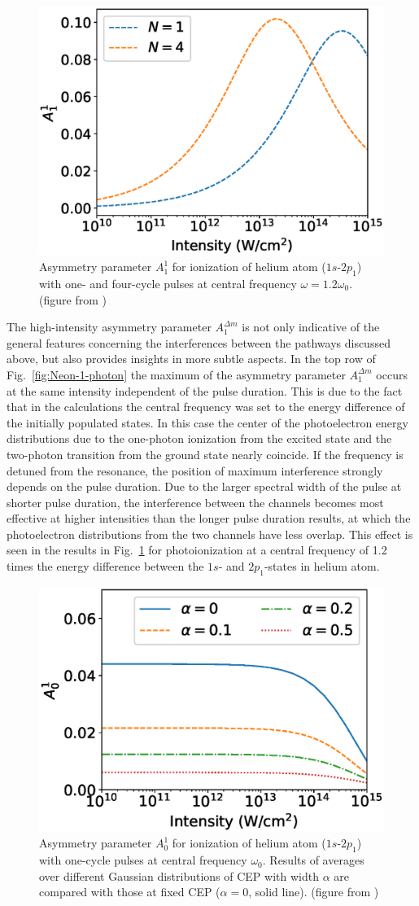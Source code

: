 \begin{figure}[!ht]
\centering
\includegraphics[width=.45\linewidth]{figs/Photo_ionization/GAP/He_2p1_detune_1p2.eps}
\caption{ 
Asymmetry parameter $A_1^1$ for ionization of helium atom ($1s$-$2p_1$) with one- and four-cycle pulses at central frequency 
$\omega=1.2\omega_0$. (figure from \cite{venzke2020_GAP})
} 
  \label{fig:detuned_GAP}
\end{figure}

The high-intensity asymmetry parameter $A_1^{\Delta m}$ is not only indicative of the general features concerning the interferences between the pathways discussed above, but also provides insights in more subtle aspects. In the top row of Fig.~\ref{fig:Neon-1-photon} the maximum of the asymmetry parameter $A_1^{\Delta m}$ occurs at the same intensity independent of the pulse duration. This is due to the fact that in the calculations the central frequency was set to the energy difference of the initially populated states. In this case the center of the photoelectron energy distributions due to the one-photon ionization from the excited state and the two-photon transition from the ground state nearly coincide. If the frequency is detuned from the resonance, the position of maximum interference strongly depends on the pulse duration. Due to the larger spectral width of the pulse at shorter pulse duration, the interference between the channels becomes most effective at higher intensities than the longer pulse duration results, at which the photoelectron distributions from the two channels have less overlap. This effect is seen in the results in Fig.\ \ref{fig:detuned_GAP} for photoionization at a central frequency of 1.2 times the energy difference between the $1s$- and $2p_1$-states in helium atom. 

\begin{figure}[!ht]
\centering
\includegraphics[width=.45\linewidth]{figs/Photo_ionization/GAP/He_2p1_asym_alpha.eps}
\caption{
Asymmetry parameter $A_0^1$ for ionization of helium atom ($1s$-$2p_1$) with one-cycle pulses at central frequency $\omega_0$. Results of averages over different Gaussian distributions of CEP with width $\alpha$ are compared with those at fixed CEP ($\alpha =0$, solid line). (figure from \cite{venzke2020_GAP})
} 
  \label{fig:cep_avg}
\end{figure}

